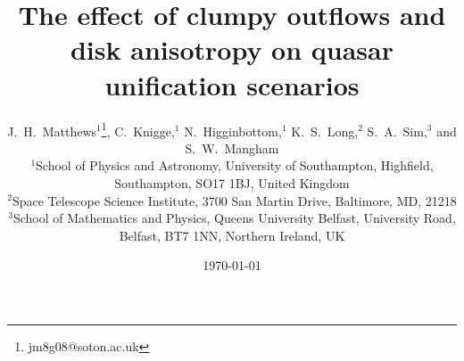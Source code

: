 \documentclass[useAMS,usenatbib]{mn2e_x}
\begin{document}


\def\py{\textsc{Python} }
\def\tar{\textsc{Tardis} }
\def\cld{\textsc{Cloudy} }
\def\agn{\textsc{Agnspec} }


\def\civ{C~\textsc{iv}}
\def\nv{N~\textsc{v}}
\def\heii{He~\textsc{ii}}
\def\ovi{O~\textsc{vi}}
\def\la{Ly$\alpha$}
\def\ha{H$\alpha$}

\def\araa{ARAA}
\def\nat{Nature}
\def\apjl{ApJ Letters}
\def\aapr{AAPR}
\def\ssr{SSR}
\def\apj{ApJ}
\def\pasp{PASP}
\def\aap{A\&A}
\def\mnras{MNRAS}
\def\aj{AJ}
\def\rmxaa{RMXAA}

%
%

\title
{
The effect of clumpy outflows
and disk anisotropy on quasar unification scenarios
}



\author[Matthews et al.]{J.~H.~Matthews$^1$\thanks{jm8g08@soton.ac.uk}, C.~Knigge,$^1$
N.~Higginbottom,$^1$ K.~S.~Long,$^2$ S.~A.~Sim,$^3$ and S.~W.~Mangham
\medskip  
\\$^1$School of Physics and Astronomy, University of Southampton, Highfield, Southampton, SO17 1BJ, United Kingdom
\\$^2$Space Telescope Science Institute, 3700 San Martin Drive, Baltimore, MD, 21218
\\$^3$School of Mathematics and Physics, Queens University Belfast, University Road, Belfast, BT7 1NN, Northern Ireland, UK}

\date{\today}


%
%

\maketitle
\end{document}
